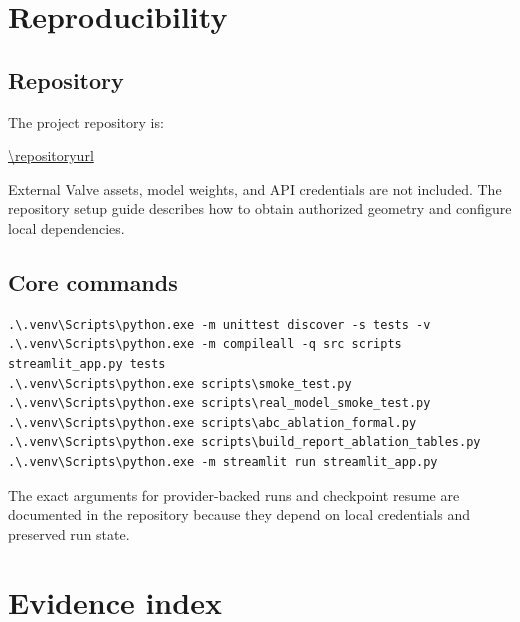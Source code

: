 \section{Reproducibility}
\label{app:reproducibility}

\subsection{Repository}

The project repository is:

\begin{center}
  \url{\repositoryurl}
\end{center}

External Valve assets, model weights, and API credentials are not included.
The repository setup guide describes how to obtain authorized geometry and
configure local dependencies.

\subsection{Core commands}

\begin{lstlisting}[basicstyle=\ttfamily\small,breaklines=true,frame=single]
.\.venv\Scripts\python.exe -m unittest discover -s tests -v
.\.venv\Scripts\python.exe -m compileall -q src scripts streamlit_app.py tests
.\.venv\Scripts\python.exe scripts\smoke_test.py
.\.venv\Scripts\python.exe scripts\real_model_smoke_test.py
.\.venv\Scripts\python.exe scripts\abc_ablation_formal.py
.\.venv\Scripts\python.exe scripts\build_report_ablation_tables.py
.\.venv\Scripts\python.exe -m streamlit run streamlit_app.py
\end{lstlisting}

The exact arguments for provider-backed runs and checkpoint resume are documented
in the repository because they depend on local credentials and preserved run
state.

\section{Evidence index}
\label{app:evidence}

